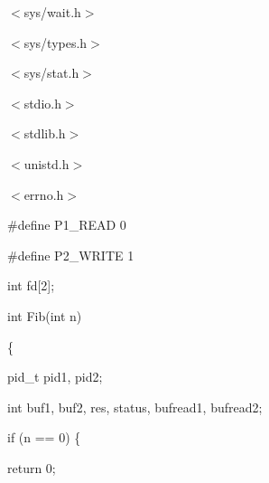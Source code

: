 \documentclass[a4paper,portrait,12pt]{article}
\begin{document}
\begin{flushleft}
$<$sys/wait.h$>$
\end{flushleft}


\begin{flushleft}
$<$sys/types.h$>$
\end{flushleft}


\begin{flushleft}
$<$sys/stat.h$>$
\end{flushleft}


\begin{flushleft}
$<$stdio.h$>$
\end{flushleft}


\begin{flushleft}
$<$stdlib.h$>$
\end{flushleft}


\begin{flushleft}
$<$unistd.h$>$
\end{flushleft}


\begin{flushleft}
$<$errno.h$>$
\end{flushleft}





\begin{flushleft}
\#define P1\_READ 0
\end{flushleft}


\begin{flushleft}
\#define P2\_WRITE 1
\end{flushleft}


\begin{flushleft}
int fd[2];
\end{flushleft}


\begin{flushleft}
int Fib(int n)
\end{flushleft}


\{


\begin{flushleft}
pid\_t pid1, pid2;
\end{flushleft}


\begin{flushleft}
int buf1, buf2, res, status, bufread1, bufread2;
\end{flushleft}


\begin{flushleft}
if (n == 0) \{
\end{flushleft}


\begin{flushleft}
return 0;
\end{flushleft}
\end{document}
